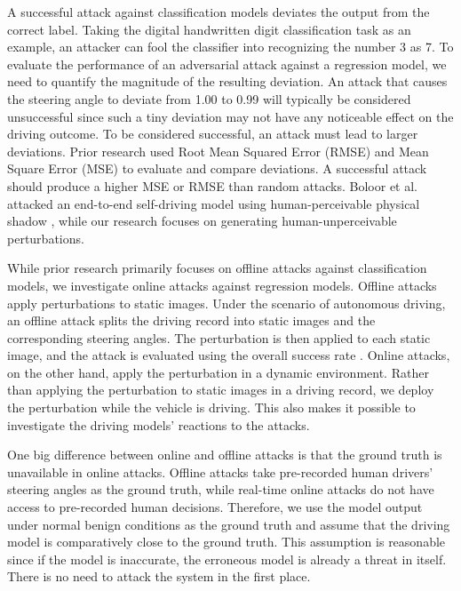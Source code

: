 A successful attack against classification models deviates the output from the correct label. Taking the digital handwritten digit classification task as an example, an attacker can fool the classifier into recognizing the number 3 as 7. To evaluate the performance of an adversarial attack against a regression model, we need to quantify the magnitude of the resulting deviation. An attack that causes the steering angle to deviate from 1.00 to 0.99 will typically be considered unsuccessful since such a tiny deviation may not have any noticeable effect on the driving outcome. To be considered successful, an attack must lead to larger deviations. Prior research used Root Mean Squared Error (RMSE) \citep{msml} and Mean Square Error (MSE) \citep{nguyen2018adversarial} to evaluate and compare deviations. A successful attack should produce a higher MSE or RMSE than random attacks. Boloor et al. attacked an end-to-end self-driving model using human-perceivable physical shadow \citep{boloor2019}, while our research focuses on generating human-unperceivable perturbations.

While prior research primarily focuses on offline attacks against classification models, we investigate online attacks against regression models. Offline attacks apply perturbations to static images. Under the scenario of autonomous driving, an offline attack splits the driving record into static images and the corresponding steering angles. The perturbation is then applied to each static image, and the attack is evaluated using the overall success rate \citep{Deng2020}. Online attacks, on the other hand, apply the perturbation in a dynamic environment. Rather than applying the perturbation to static images in a driving record, we deploy the perturbation while the vehicle is driving. This also makes it possible to investigate the driving models' reactions to the attacks. 

One big difference between online and offline attacks is that the ground truth is unavailable in online attacks. Offline attacks take pre-recorded human drivers' steering angles as the ground truth, while real-time online attacks do not have access to pre-recorded human decisions. Therefore, we use the model output under normal benign conditions as the ground truth and assume that the driving model is comparatively close to the ground truth. This assumption is reasonable since if the model is inaccurate, the erroneous model is already a threat in itself. There is no need to attack the system in the first place.

